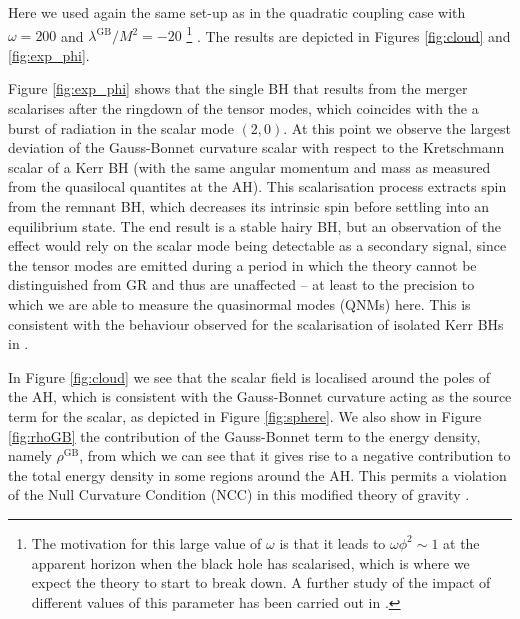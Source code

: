 \documentclass[reprint,aps,amsmath,amssymb,twoside,prd,showkeys,superscriptaddress,nofootinbib]{revtex4-2}
\begin{document}
Here we used again the same set-up as in the quadratic coupling case with $\omega=200$ and $\lambda^{\text{GB}}/M^2=-20$ \footnote{The motivation for this large value of $\omega$ is that it leads to $\omega\phi^2\sim1$ at the apparent horizon when the black hole has scalarised, which is where we expect the theory to start to break down. A further study of the impact of different values of this parameter has been carried out in \cite{Doneva:2023oww}.} . The results are depicted in Figures \ref{fig:cloud} and \ref{fig:exp_phi}. 

Figure \ref{fig:exp_phi} shows that the single BH that results from the merger scalarises after the ringdown of the tensor modes, which coincides with the a burst of radiation in the scalar mode $(2,0)$. At this point we observe the largest deviation of the Gauss-Bonnet curvature scalar with respect to the Kretschmann scalar of a Kerr BH (with the same angular momentum and mass as measured from the quasilocal quantites at the AH). This scalarisation process extracts spin from the remnant  BH, which decreases its intrinsic spin before settling into an equilibrium state. The end result is a stable hairy BH, but an observation of the effect would rely on the scalar mode being detectable as a secondary signal, since the tensor modes are emitted during a period in which the theory cannot be distinguished from GR and thus are unaffected -- at least to the precision to which we are able to measure the quasinormal modes (QNMs) here. This is consistent with the behaviour observed for the scalarisation of isolated Kerr BHs in \cite{East:2021bqk}.

In Figure \ref{fig:cloud} we see that the scalar field is localised around the poles of the AH, which is consistent with  the Gauss-Bonnet curvature acting as the source term for the scalar, as depicted in Figure \ref{fig:sphere}. We also show in Figure \ref{fig:rhoGB} the contribution of the Gauss-Bonnet term to the energy density, namely $\rho^{\text{GB}}$, from which we can see that it gives rise to a negative contribution to the total energy density in some regions around the AH. This permits a violation of the Null Curvature Condition (NCC) in this modified theory of gravity \cite{R:2022hlf}.
\end{document}
